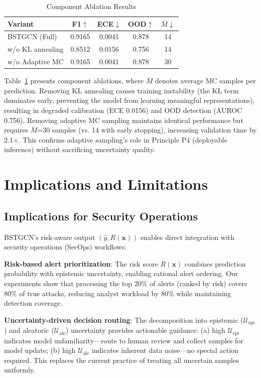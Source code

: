 \documentclass[lettersize,journal]{IEEEtran}
\begin{document}
\begin{table}[!t]
\caption{Component Ablation Results\label{tab:ablation}}
\centering
\begin{tabular}{lcccc}
\hline
\textbf{Variant} & \textbf{F1}$\uparrow$ & \textbf{ECE}$\downarrow$ & \textbf{OOD}$\uparrow$ & \textbf{$\bar{M}$}$\downarrow$ \\
\hline
BSTGCN (Full) & 0.9165 & 0.0041 & 0.878 & 14 \\
\quad w/o KL annealing & 0.8512 & 0.0156 & 0.756 & 14 \\
\quad w/o Adaptive MC & 0.9165 & 0.0041 & 0.878 & 30 \\
\hline
\end{tabular}
\end{table}

Table~\ref{tab:ablation} presents component ablations, where $\bar{M}$ denotes average MC samples per prediction. Removing KL annealing causes training instability (the KL term dominates early, preventing the model from learning meaningful representations), resulting in degraded calibration (ECE 0.0156) and OOD detection (AUROC 0.756). Removing adaptive MC sampling maintains identical performance but requires $\bar{M}$=30 samples (vs. 14 with early stopping), increasing validation time by 2.1$\times$. This confirms adaptive sampling's role in Principle P4 (deployable inference) without sacrificing uncertainty quality.
\section{Implications and Limitations}

\subsection{Implications for Security Operations}

BSTGCN's risk-aware output $(\hat{y}, R(\mathbf{x}))$ enables direct integration with security operations (SecOps) workflows:

\textbf{Risk-based alert prioritization}: The risk score $R(\mathbf{x})$ combines prediction probability with epistemic uncertainty, enabling rational alert ordering. Our experiments show that processing the top 20\% of alerts (ranked by risk) covers 80\% of true attacks, reducing analyst workload by 80\% while maintaining detection coverage.

\textbf{Uncertainty-driven decision routing}: The decomposition into epistemic ($\mathcal{U}_{\text{epi}}$) and aleatoric ($\mathcal{U}_{\text{ale}}$) uncertainty provides actionable guidance: (a) high $\mathcal{U}_{\text{epi}}$ indicates model unfamiliarity---route to human review and collect samples for model update; (b) high $\mathcal{U}_{\text{ale}}$ indicates inherent data noise---no special action required. This replaces the current practice of treating all uncertain samples uniformly.
\end{document}
